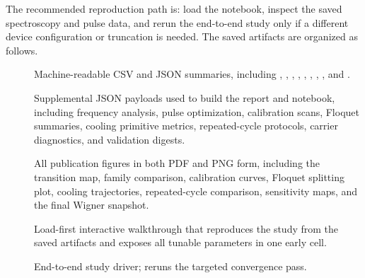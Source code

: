 \documentclass[aps,pra,twocolumn,reprint,floatfix,amsmath,amssymb]{revtex4-2}
\begin{document}
The recommended reproduction path is: load the notebook, inspect the saved spectroscopy and pulse data, and rerun the end-to-end study only if a different device configuration or truncation is needed. The saved artifacts are organized as follows.

\begin{description}
\item[] Machine-readable CSV and JSON summaries, including , , , , , , , , and .
\item[] Supplemental JSON payloads used to build the report and notebook, including frequency analysis, pulse optimization, calibration scans, Floquet summaries, cooling primitive metrics, repeated-cycle protocols, carrier diagnostics, and validation digests.
\item[] All publication figures in both PDF and PNG form, including the transition map, family comparison, calibration curves, Floquet splitting plot, cooling trajectories, repeated-cycle comparison, sensitivity maps, and the final Wigner snapshot.
\item[] Load-first interactive walkthrough that reproduces the study from the saved artifacts and exposes all tunable parameters in one early cell.
\item[] End-to-end study driver;  reruns the targeted convergence pass.
\end{description}
\end{document}
